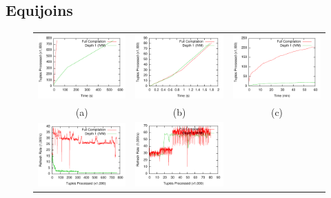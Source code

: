 \subsection{Equijoins}
\begin{figure}
\begin{center}
\begin{tabular}{ccc}
\includegraphics[width=2.2in]{../graphs/graphs/time_tpch3.pdf} &
\includegraphics[width=2.2in]{../graphs/graphs/time_tpch11.pdf} &
\includegraphics[width=2.2in]{../graphs/graphs/time_ssb4.pdf} \\
(a) & (b) & (c) \\
\includegraphics[width=2.2in]{../graphs/graphs/windowedrate_tpch3.pdf} &
\includegraphics[width=2.2in]{../graphs/graphs/windowedrate_tpch11.pdf} &

\end{tabular}
\end{center}
\end{figure}
